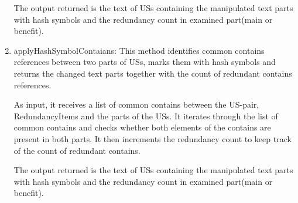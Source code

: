 \begin{enumerate}
	The output returned is the text of USs containing the manipulated text parts with hash symbols and the redundancy count in examined part(main or benefit).
	
	\item applyHashSymbolContaians: This method identifies common contains references between two parts of USs, marks them with hash symbols and returns the changed text parts together with the count of redundant contains references. 
	
	As input, it receives a list of common contains between the US-pair, RedundancyItems and the parts of the USs. It iterates through the list of common contains and checks whether both elements of the contains are present in both parts. It then increments the redundancy count to keep track of the count of redundant contains.
	
	The output returned is the text of USs containing the manipulated text parts with hash symbols and the redundancy count in examined part(main or benefit).
	
\end{enumerate}
